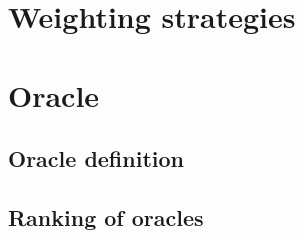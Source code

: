 \section{Weighting strategies} %
\section{Oracle} %
\subsection{Oracle definition} %
\subsection{Ranking of oracles}
